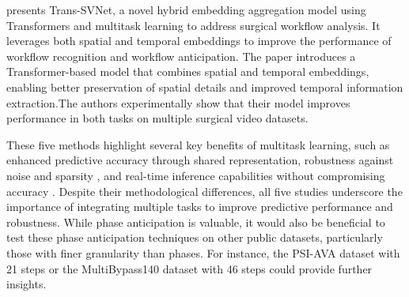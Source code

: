 \begin{table}[htb!]
\caption{Methods that utilize multitask learning for skill assessment. * HP - hard parameter sharing. } \label{skills_tasks:table}
\end{table}

 \citet{jin2022trans} presents Trans-SVNet, a novel hybrid embedding aggregation model using Transformers and multitask learning to address surgical workflow analysis. It leverages both spatial and temporal embeddings to improve the performance of workflow recognition and workflow anticipation. The paper introduces a Transformer-based model that combines spatial and temporal embeddings, enabling better preservation of spatial details and improved temporal information extraction.The authors experimentally show that their model improves performance in both tasks on multiple surgical video datasets. 
 

These  five methods \citet{twinanda2018rsdnet,rivoir2020rethinking,yuan2022anticipation,ban2022supr,jin2022trans} highlight several key benefits of multitask learning, such as enhanced predictive accuracy through shared representation, robustness against noise and sparsity \cite{rivoir2020rethinking,jin2022trans}, and real-time inference capabilities without compromising accuracy \cite{ban2022supr,yuan2022anticipation}. Despite their methodological differences, all five studies underscore the importance of integrating multiple tasks to improve predictive performance and robustness.
While phase anticipation is valuable, it would also be beneficial to test these phase anticipation techniques on other public datasets, particularly those with finer granularity than phases. For instance, the PSI-AVA dataset \citep{holistic_scene_understanding} with 21 steps or the MultiBypass140 dataset \citep{Lavanchy2024} with 46 steps could provide further insights.



